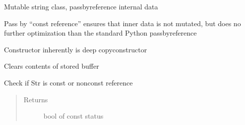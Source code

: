 \documentclass[letterpaper,10pt,english]{sphinxmanual}
\begin{document}
\begin{fulllineitems}
\label{\detokenize{api/mutable_string:data_structures.mutable_string.Str}}
Mutable string class, pass\sphinxhyphen{}by\sphinxhyphen{}reference internal data

Pass by “const reference” ensures that inner data is not mutated, but does no further
optimization than the standard Python pass\sphinxhyphen{}by\sphinxhyphen{}reference

Constructor inherently is deep copy\sphinxhyphen{}constructor

\begin{fulllineitems}
\label{\detokenize{api/mutable_string:data_structures.mutable_string.Str.clear}}
Clears contents of stored buffer

\end{fulllineitems}


\begin{fulllineitems}
\label{\detokenize{api/mutable_string:data_structures.mutable_string.Str.const}}
Check if Str is const or non\sphinxhyphen{}const reference
\begin{quote}\begin{description}
\item[{Returns}] \leavevmode
bool of const status

\end{description}\end{quote}

\end{fulllineitems}



\end{fulllineitems}
\end{document}
